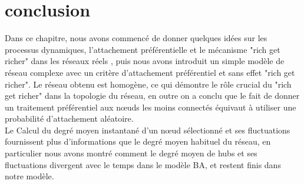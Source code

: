 \section{conclusion}

Dans ce chapitre, nous avons commencé de donner quelques idées sur les processus dynamiques, l'attachement préférentielle et le mécanisme "rich get richer" dans les réseaux réels , puis nous avons introduit un simple modèle de réseau complexe avec un critère d'attachement préférentiel et sans effet "rich get richer". Le réseau obtenu est homogène, ce qui démontre le rôle crucial du "rich get richer" dans la topologie du réseau, en outre on a conclu que le fait de donner un traitement préférentiel aux nœuds les moins connectés équivaut à utiliser une probabilité d'attachement aléatoire. \\
Le Calcul du degré moyen instantané d'un nœud sélectionné et ses fluctuations fournissent plus d'informations que le degré moyen habituel du réseau, en particulier nous avons montré comment le degré moyen de hubs et ses fluctuations divergent avec le temps dans le modèle BA, et restent finis dans notre modèle.
